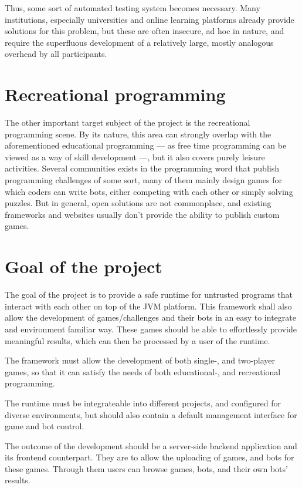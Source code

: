 	Thus, some sort of automated testing system becomes necessary. Many institutions, especially universities and online learning platforms already provide solutions for this problem, but these are often insecure, ad hoc in nature, and require the superfluous development of a relatively large, mostly analogous overhead by all participants.
	
	\section{Recreational programming}

	The other important target subject of the project is the recreational programming scene. By its nature, this area can strongly overlap with the aforementioned educational programming --- as free time programming can be viewed as a way of skill development ---, but it also covers purely leisure activities. Several communities exists in the programming word that publish programming challenges of some sort, many of them mainly design games for which coders can write bots, either competing with each other or simply solving puzzles. But in general, open solutions are not commonplace, and existing frameworks and websites usually don't provide the ability to publish custom games. 

	\section{Goal of the project}
	
	The goal of the project is to provide a safe runtime for untrusted programs that interact with each other on top of the JVM platform. This framework shall also allow the development of games/challenges and their bots in an easy to integrate and environment familiar way. These games should be able to effortlessly provide meaningful results, which can then be processed by a user of the runtime.
	
	The framework must allow the development of both single-, and two-player games, so that it can satisfy the needs of both educational-, and recreational programming.
	
	The runtime must be integrateable into different projects, and configured for diverse environments, but should also contain a default management interface for game and bot control. 

	The outcome of the development should be a server-side backend application and its frontend counterpart. They are to allow the uploading of games, and bots for these games. Through them users can browse games, bots, and their own bots' results.
	
